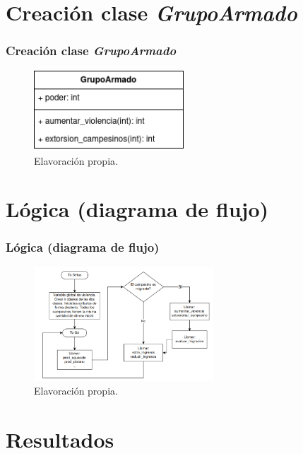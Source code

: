 \documentclass[17pt, t, lualatex]{beamer}
\begin{document}
\section{Creación clase \textit{GrupoArmado}}

\insertsectionpage

\begin{frame}
  \frametitle{Creación clase \textit{GrupoArmado}}
  \begin{figure}[ht]
    \centering
    \includegraphics[width = 0.5\textwidth]{img/ClaseGrupoArmado.png}
    \caption{Elavoración propia.}
  \end{figure}
\end{frame}

    
\section{Lógica (diagrama de flujo)}

\insertsectionpage

\begin{frame}
  \frametitle{Lógica (diagrama de flujo)}
  \begin{figure}[ht]
    \centering
    \includegraphics[width = 0.6\textwidth]{img/img3.png}
    \caption{Elavoración propia.}
  \end{figure}
\end{frame}





\section{Resultados}
\end{document}
